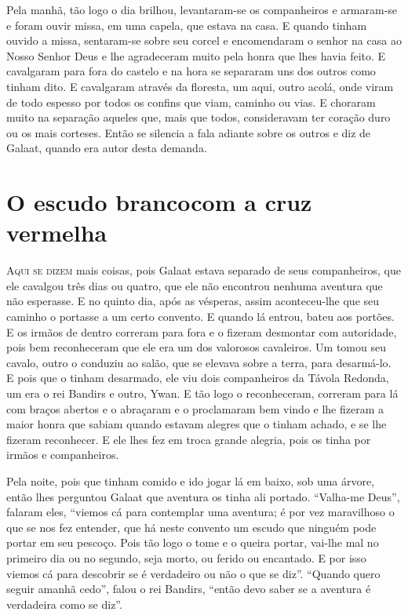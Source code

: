 Pela manhã, tão logo o dia brilhou, levantaram-se os companheiros e armaram-se e
foram ouvir missa, em uma capela, que estava na casa. E quando tinham ouvido a
missa, sentaram-se sobre seu corcel e encomendaram o senhor na casa ao Nosso
Senhor Deus e lhe agradeceram muito pela honra que lhes havia feito. E
cavalgaram para fora do castelo e na hora se separaram uns dos outros como
tinham dito. E cavalgaram através da floresta, um aqui, outro acolá, onde viram
de todo espesso por todos os confins que viam, caminho ou vias. E choraram
muito na separação aqueles que, mais que todos, consideravam ter coração duro
ou os mais corteses. Então se silencia a fala adiante sobre os outros e diz de
Galaat, quando era autor desta demanda. 
\oneside

\chapter[O escudo branco com a cruz vermelha]{O escudo branco\break com a cruz vermelha}

\textsc{Aqui se dizem} mais coisas, pois Galaat estava separado de seus companheiros, que
ele cavalgou três dias ou quatro, que ele não encontrou nenhuma aventura que
não esperasse. E no quinto dia, após as vésperas, assim aconteceu-lhe que seu
caminho o portasse a um certo convento. E quando lá entrou, bateu aos portões.
E os irmãos de dentro correram para fora e o fizeram desmontar com autoridade,
pois bem reconheceram que ele era um dos valorosos cavaleiros. Um tomou seu
cavalo, outro o conduziu ao salão, que se elevava sobre a terra, para
desarmá-lo. E pois que o tinham desarmado, ele viu dois companheiros da Távola
Redonda, um era o rei Bandirs e outro, Ywan. E tão logo o reconheceram,
correram para lá com braços abertos e o abraçaram e o proclamaram bem vindo e
lhe fizeram a maior honra que sabiam quando estavam alegres que o tinham
achado, e se lhe fizeram reconhecer. E ele lhes fez em troca grande alegria,
pois os tinha por irmãos e companheiros. 

Pela noite, pois que tinham comido e ido jogar lá em baixo, sob uma árvore,
então lhes perguntou Galaat que aventura os tinha ali portado. “Valha-me Deus”,
falaram eles, “viemos cá para contemplar uma aventura; é por vez maravilhoso o
que se nos fez entender, que há neste convento um escudo que ninguém pode
portar em seu pescoço. Pois tão logo o tome e o queira portar, vai-lhe mal no
primeiro dia ou no segundo, seja morto, ou ferido ou encantado. E por isso
viemos cá para descobrir se é verdadeiro ou não o que se diz”. “Quando quero
seguir amanhã cedo”, falou o rei Bandirs, “então devo saber se a aventura é
verdadeira como se diz”. 

